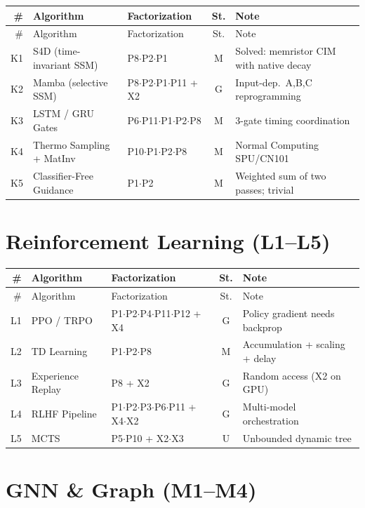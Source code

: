 \documentclass[10pt]{article}
\begin{document}
\begin{longtable}{rlp{3.0cm}cp{4.8cm}}
\toprule
\# & Algorithm & Factorization & St. & Note \\
\midrule
\endfirsthead
\toprule
\# & Algorithm & Factorization & St. & Note \\
\midrule
\endhead
\bottomrule
\endfoot
K1 & S4D (time-invariant SSM) & P8$\cdot$P2$\cdot$P1 & M & Solved: memristor CIM with native decay \\
K2 & Mamba (selective SSM) & P8$\cdot$P2$\cdot$P1$\cdot$P11 + X2 & G & Input-dep.\ A,B,C reprogramming \\
K3 & LSTM / GRU Gates & P6$\cdot$P11$\cdot$P1$\cdot$P2$\cdot$P8 & M & 3-gate timing coordination \\
K4 & Thermo Sampling + MatInv & P10$\cdot$P1$\cdot$P2$\cdot$P8 & M & Normal Computing SPU/CN101 \\
K5 & Classifier-Free Guidance & P1$\cdot$P2 & M & Weighted sum of two passes; trivial \\
\end{longtable}

\section{Reinforcement Learning (L1--L5)}

\begin{longtable}{rlp{3.0cm}cp{4.8cm}}
\toprule
\# & Algorithm & Factorization & St. & Note \\
\midrule
\endfirsthead
\toprule
\# & Algorithm & Factorization & St. & Note \\
\midrule
\endhead
\bottomrule
\endfoot
L1 & PPO / TRPO & P1$\cdot$P2$\cdot$P4$\cdot$P11$\cdot$P12 + X4 & G & Policy gradient needs backprop \\
L2 & TD Learning & P1$\cdot$P2$\cdot$P8 & M & Accumulation + scaling + delay \\
L3 & Experience Replay & P8 + X2 & G & Random access (X2 on GPU) \\
L4 & RLHF Pipeline & P1$\cdot$P2$\cdot$P3$\cdot$P6$\cdot$P11 + X4$\cdot$X2 & G & Multi-model orchestration \\
L5 & MCTS & P5$\cdot$P10 + X2$\cdot$X3 & U & Unbounded dynamic tree \\
\end{longtable}

\section{GNN \& Graph (M1--M4)}
\end{document}
